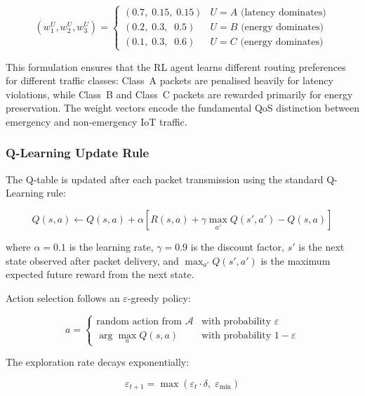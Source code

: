 \documentclass[12pt]{article}
\begin{document}
\begin{equation}
(w_1^U, w_2^U, w_3^U) = \begin{cases}
(0.7,\; 0.15,\; 0.15) & U = A \text{ (latency dominates)} \\
(0.2,\; 0.3,\;\; 0.5)  & U = B \text{ (energy dominates)} \\
(0.1,\; 0.3,\;\; 0.6)  & U = C \text{ (energy dominates)}
\end{cases}
\label{eq:weights}
\end{equation}

This formulation ensures that the RL agent learns different routing
preferences for different traffic classes: Class~A packets are
penalised heavily for latency violations, while Class~B and Class~C
packets are rewarded primarily for energy preservation. The weight
vectors encode the fundamental QoS distinction between emergency and
non-emergency IoT traffic.

\subsubsection{Q-Learning Update Rule}\label{sec:qupdate}

The Q-table is updated after each packet transmission using the
standard Q-Learning rule:

\begin{equation}
Q(s, a) \leftarrow Q(s, a) + \alpha \left[
  R(s, a) + \gamma \max_{a'} Q(s', a') - Q(s, a)
\right]
\label{eq:qupdate}
\end{equation}

where $\alpha = 0.1$ is the learning rate, $\gamma = 0.9$ is the
discount factor, $s'$ is the next state observed after packet
delivery, and $\max_{a'} Q(s', a')$ is the maximum expected future
reward from the next state.

Action selection follows an $\varepsilon$-greedy policy:

\begin{equation}
a = \begin{cases}
\text{random action from } \mathcal{A} & \text{with probability } \varepsilon \\
\arg\max_a Q(s, a) & \text{with probability } 1 - \varepsilon
\end{cases}
\label{eq:egreedy}
\end{equation}

The exploration rate decays exponentially:

\begin{equation}
\varepsilon_{t+1} = \max(\varepsilon_t \cdot \delta,\; \varepsilon_{\min})
\label{eq:epsdecay}
\end{equation}
\end{document}
